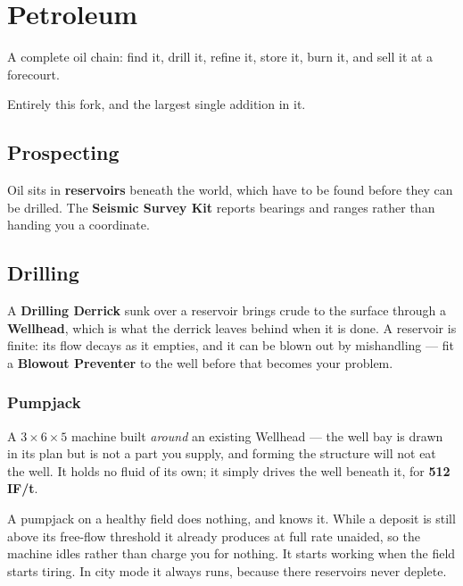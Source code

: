 \chapter{Petroleum}
\label{ch:petroleum}

A complete oil chain: find it, drill it, refine it, store it, burn it, and sell it at a forecourt.

\begin{iefork}
Entirely this fork, and the largest single addition in it.
\end{iefork}

\section{Prospecting}

Oil sits in \textbf{reservoirs} beneath the world, which have to be found before they can be
drilled. The \textbf{Seismic Survey Kit} reports bearings and ranges rather than handing you a
coordinate.

\section{Drilling}

A \textbf{Drilling Derrick} sunk over a reservoir brings crude to the surface through a
\textbf{Wellhead}, which is what the derrick leaves behind when it is done. A reservoir is finite:
its flow decays as it empties, and it can be blown out by mishandling --- fit a \textbf{Blowout
Preventer} to the well before that becomes your problem.

\subsection*{Pumpjack}

A $3\times6\times5$ machine built \emph{around} an existing Wellhead --- the well bay is drawn in
its plan but is not a part you supply, and forming the structure will not eat the well. It holds no
fluid of its own; it simply drives the well beneath it, for \textbf{512\,IF/t}.

\begin{ietip}
A pumpjack on a healthy field does nothing, and knows it. While a deposit is still above its
free-flow threshold it already produces at full rate unaided, so the machine idles rather than
charge you for nothing. It starts working when the field starts tiring. In city mode it always
runs, because there reservoirs never deplete.
\end{ietip}

